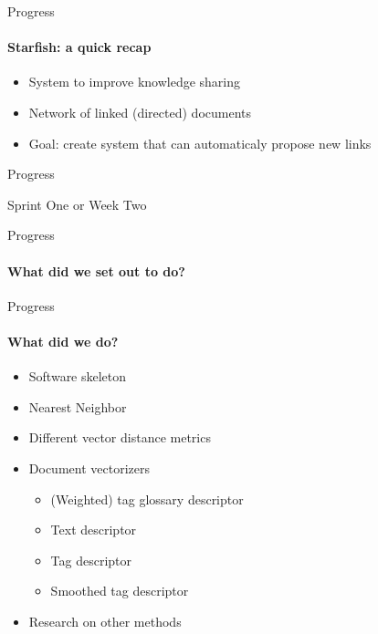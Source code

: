 
\begin{frame}[t]{Progress}

\framesubtitle{Starfish: a quick recap}

\begin{itemize}
  \item System to improve knowledge sharing
  \item Network of linked (directed) documents
  \item Goal: create system that can automaticaly propose new links
\end{itemize}


\end{frame}




\begin{frame}[t]{Progress}

  \huge{Sprint One or Week Two}

\end{frame}




\begin{frame}[t]{Progress}

\framesubtitle{What did we set out to do?}


\end{frame}

\begin{frame}[t]{Progress}

\framesubtitle{What did we do?}

\begin{itemize}
\item Software skeleton
\item Nearest Neighbor
\item Different vector distance metrics
\item Document vectorizers \\
  \begin{itemize}
    \item (Weighted) tag glossary descriptor
    \item Text descriptor
    \item Tag descriptor
    \item Smoothed tag descriptor
  \end{itemize}
\item Research on other methods
\end{itemize}

\end{frame}



